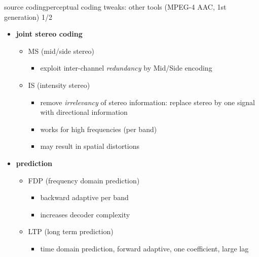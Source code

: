 	\begin{frame}{source coding}{perceptual coding tweaks: other tools (MPEG-4 AAC, 1st generation) 1/2}
		\begin{itemize}
			\item	\textbf{joint stereo coding}
                \begin{itemize}
                    \item   MS (mid/side stereo)
                        \begin{itemize}
                            \item   exploit inter-channel \textit{redundancy} by Mid/Side encoding
                        \end{itemize}
                    \item   IS (intensity stereo)
                        \begin{itemize}
                            \item   remove \textit{irrelevancy} of stereo information: replace stereo by one signal with directional information
                            \item   works for high frequencies (per band)
                            \item   may result in spatial distortions
                        \end{itemize}
                \end{itemize}
            \pause
            \bigskip
            
            \item   \textbf{prediction}
                \begin{itemize}
                    \item   FDP (frequency domain prediction)
                        \begin{itemize}
                            \item   backward adaptive per band
                            \item   increases decoder complexity
                        \end{itemize}
                    \item   LTP (long term prediction)
                        \begin{itemize}
                            \item   time domain prediction, forward adaptive, one coefficient, large lag
                        \end{itemize}
                \end{itemize}
		\end{itemize}
	\end{frame}
